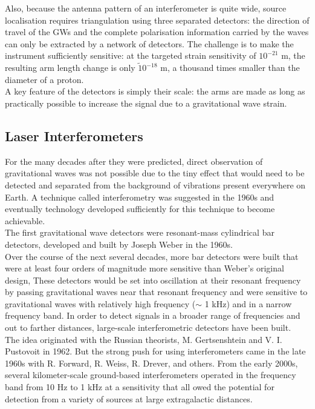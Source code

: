 \documentclass[binding=0.6cm, LaM]{sapthesis}
\begin{document}
	Also, because the antenna pattern of an interferometer is quite wide, 
	source localisation requires triangulation using three separated detectors: 
	the direction of travel of the GWs and the complete polarisation information carried by the waves can only be extracted by a network of detectors. 
	The challenge is to make the instrument sufficiently sensitive: 
	at the targeted strain sensitivity of $10^{−21}$ m, the resulting arm length change is only $\tilde 10^{-18}$ m, 
	a thousand times smaller than the diameter of a proton. \\
	A key feature of the detectors is simply their scale: 
	the arms are made as long as practically possible to increase the signal due to a gravitational wave strain. 

\subsection{Laser Interferometers}

	For the many decades after they were predicted, direct observation of gravitational waves was not possible 
	due to the tiny effect that would need to be detected and separated from the background of vibrations present everywhere on Earth.
	A technique called interferometry was suggested in the 1960s and eventually technology developed  
	sufficiently for this technique to become achievable. \\
	The first gravitational wave detectors were resonant-mass cylindrical bar detectors, 
	developed and built by Joseph Weber in the 1960s. \\
	Over the course of the next several decades, more bar detectors were built that were at least 
	four orders of magnitude more sensitive than Weber’s original design, 
	These detectors would be set into oscillation at their resonant frequency by passing gravitational waves 
	near that resonant frequency and were sensitive to gravitational waves with relatively high frequency ($\sim$ 1 kHz) 
	and in a narrow frequency band. In order to detect signals in a broader range of frequencies and out to farther distances, 
	large-scale interferometric detectors have been built. \\ 
	The idea originated with the Russian theorists, M. Gertsenshtein and V. I. Pustovoit in 1962. 
	But the strong push for using interferometers came in the late 1960s with R. Forward, R. Weiss, 
	R. Drever, and others. From the early 2000s, several kilometer-scale ground-based interferometers 
	operated in the frequency band from 10 Hz to 1 kHz at a sensitivity that all
	owed the potential for detection from a variety of sources at large extragalactic distances.
\end{document}
